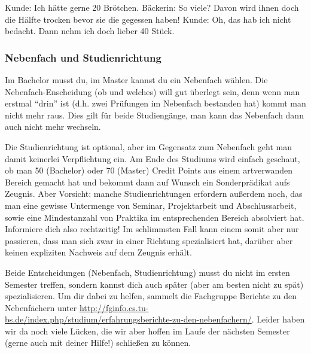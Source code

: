 Kunde: Ich hätte gerne 20 Brötchen. 
Bäckerin: So viele? Davon wird ihnen doch die Hälfte trocken bevor sie die gegessen haben!
Kunde: Oh, das hab ich nicht bedacht. Dann nehm ich doch lieber 40 Stück.

\subsubsection{Nebenfach und Studienrichtung}
\label{nebenfach}
Im Bachelor musst du, im Master kannst du ein Nebenfach wählen.
 Die Nebenfach-Enscheidung (ob und welches) will gut überlegt sein, denn wenn man
 erstmal "`drin"' ist (d.h. zwei Prüfungen im Nebenfach bestanden hat)
 kommt man nicht mehr raus. Dies gilt für beide Studiengänge, man kann
 das Nebenfach dann auch nicht mehr wechseln. 
 
Die Studienrichtung ist  optional, aber im Gegensatz zum Nebenfach
geht man damit keinerlei Verpflichtung ein. Am Ende des Studiums wird
einfach geschaut, ob man 50 (Bachelor) oder 70 (Master) Credit Points
aus einem artverwanden Bereich gemacht hat und bekommt dann auf Wunsch
ein Sonderprädikat aufs Zeugnis. Aber Vorsicht: manche Studienrichtungen
erfordern außerdem noch, das man eine gewisse Untermenge von Seminar, 
Projektarbeit und Abschlussarbeit, sowie eine Mindestanzahl von Praktika
im entsprechenden Bereich absolviert hat. Informiere dich also rechtzeitig!
Im schlimmsten Fall kann einem somit aber nur passieren, dass man sich zwar
in einer Richtung spezialisiert hat, darüber aber keinen expliziten Nachweis
auf dem Zeugnis erhält.

Beide Entscheidungen (Nebenfach, Studienrichtung) musst du nicht im 
ersten Semester treffen, sondern kannst dich auch später (aber am besten 
nicht zu spät) spezialisieren. Um dir dabei zu helfen, sammelt die
Fachgruppe Berichte zu den Nebenfächern unter
\url{http://fginfo.cs.tu-bs.de/index.php/studium/erfahrungsberichte-zu-den-nebenfachern/}. Leider
haben wir da noch viele Lücken, die wir aber hoffen im Laufe der
nächsten Semester (gerne auch mit deiner Hilfe!) schließen zu können.

